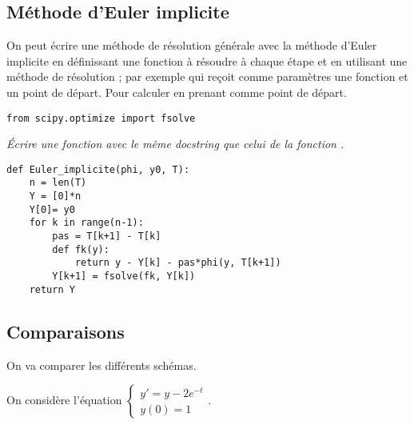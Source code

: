 \subsection{Méthode d'Euler implicite}
On peut écrire une méthode de résolution générale avec la méthode d'Euler implicite en définissant une fonction à résoudre à chaque étape et en utilisant une méthode de résolution ; par exemple  qui reçoit comme paramètres une fonction et un point de départ. Pour calculer  en prenant  comme point de départ.
\begin{lstlisting}
from scipy.optimize import fsolve
\end{lstlisting}
\begin{Exercise}\it
Écrire une fonction  avec le même docstring que celui de la fonction .
\end{Exercise}
\begin{Answer}
\begin{lstlisting}
def Euler_implicite(phi, y0, T):
    n = len(T)
    Y = [0]*n
    Y[0]= y0
    for k in range(n-1):
        pas = T[k+1] - T[k]
        def fk(y):
            return y - Y[k] - pas*phi(y, T[k+1])
        Y[k+1] = fsolve(fk, Y[k])
    return Y
\end{lstlisting}
\newpage
\end{Answer}
\subsection{Comparaisons}
On va comparer les différents schémas.

On considère l'équation $\displaystyle \left\{\begin{matrix} y' = y - 2e^{-t}\\ y(0) = 1\end{matrix}\right.$.

